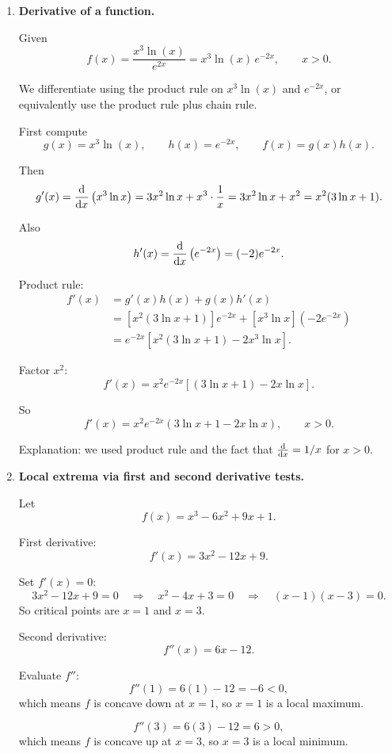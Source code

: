 \documentclass[../main.tex]{subfiles}
\begin{document}
\begin{enumerate}
Interpretation: this is the area under the straight line $2x+3$ between $x=1$ and $x=4$.


\item \textbf{Derivative of a function.}

Given
\[
  f(x) = \frac{x^3 \ln(x)}{e^{2x}} = x^3 \ln(x)\, e^{-2x}, \qquad x>0.
\]

We differentiate using the product rule on $x^3 \ln(x)$ and $e^{-2x}$, or equivalently use the product rule plus chain rule.

First compute
\[
g(x) = x^3 \ln(x), \qquad h(x) = e^{-2x}, \qquad f(x)=g(x)h(x).
\]

Then
\[
  g'(x) = \dv{x} \left( x^3 \ln x \right)
  = 3x^2 \ln x + x^3 \cdot \frac{1}{x}
  = 3x^2 \ln x + x^2
  = x^2 (3\ln x + 1).
\]

Also
\[
  h'(x) = \dv{x}\left(e^{-2x}\right) = (-2)e^{-2x}.
\]

Product rule:
\begin{align*}
f'(x)
&= g'(x)h(x) + g(x)h'(x) \\
&= \left[x^2 (3\ln x + 1)\right] e^{-2x} + \left[x^3 \ln x\right] (-2 e^{-2x}) \\
&= e^{-2x} \left[ x^2 (3\ln x + 1) - 2 x^3 \ln x \right].
\end{align*}

Factor $x^2$:
\[
f'(x)
= x^2 e^{-2x} \left[ (3\ln x + 1) - 2x \ln x \right].
\]

So
\[
  f'(x) = x^2 e^{-2x} \left( 3\ln x + 1 - 2x \ln x \right), \qquad x>0.
\]

Explanation: we used product rule and the fact that $\dv{}{x}(\ln x)=1/x$ for $x>0$.


\item \textbf{Local extrema via first and second derivative tests.}

Let
\[
  f(x) = x^3 - 6x^2 + 9x + 1.
\]

First derivative:
\[
  f'(x) = 3x^2 -12x + 9.
\]

Set $f'(x)=0$:
\[
  3x^2 -12x + 9 = 0
  \quad\Longrightarrow\quad
  x^2 -4x +3=0
  \quad\Longrightarrow\quad
  (x-1)(x-3)=0.
\]
So critical points are $x=1$ and $x=3$.

Second derivative:
\[
  f''(x) = 6x -12.
\]

Evaluate $f''$:
\[
  f''(1)=6(1)-12 = -6 <0,
\]
which means $f$ is concave down at $x=1$, so $x=1$ is a local maximum.

\[
  f''(3)=6(3)-12 = 6>0,
\]
which means $f$ is concave up at $x=3$, so $x=3$ is a local minimum.


\end{enumerate}
\end{document}
